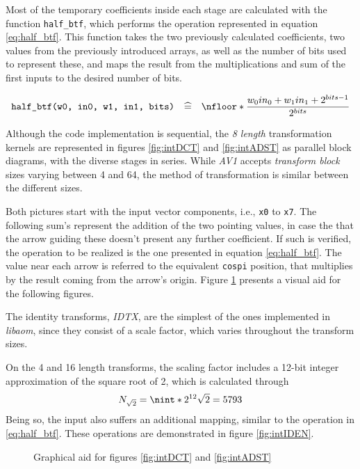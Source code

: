 Most of the temporary coefficients inside each stage are calculated with the function \verb|half_btf|, which performs the operation represented in equation \ref{eq:half_btf}. This function takes the two previously calculated coefficients, two values from the previously introduced arrays, as well as the number of bits used to represent these, and maps the result from the multiplications and sum of the first inputs to the desired number of bits.

\begin{equation} \label{eq:half_btf}
    \texttt{half\_btf(w0, in0, w1, in1, bits)} \quad \widehat{=} \quad \nfloor*{\frac{w_0in_0 + w_1in_1 + 2^{bits -1}}{2^{bits}}}
\end{equation}

Although the code implementation is sequential, the \emph{8 length} transformation kernels are represented in figures \ref{fig:intDCT} and \ref{fig:intADST} as parallel block diagrams, with the diverse stages in series. While \emph{AV1} accepts \emph{transform block} sizes varying between 4 and 64, the method of transformation is similar between the different sizes.

Both pictures start with the input vector components, i.e., \texttt{x0} to \texttt{x7}. The following sum's represent the addition of the two pointing values, in case the that the arrow guiding these doesn't present any further coefficient. If such is verified, the operation to be realized is the one presented in equation \ref{eq:half_btf}. The value near each arrow is referred to the equivalent \texttt{cospi} position, that multiplies by the result coming from the arrow's origin. Figure \ref{fig:aid} presents a visual aid for the following figures.

The identity transforms, \emph{IDTX}, are the simplest of the ones implemented in \emph{libaom}, since they consist of a scale factor, which varies throughout the transform sizes.

On the 4 and 16 length transforms, the scaling factor includes a 12-bit integer approximation of the square root of 2, which is calculated through
\begin{equation}
    N_{\sqrt{2}}=\nint*{2^{12}\sqrt{2}}=5793
\end{equation}
Being so, the input also suffers an additional mapping, similar to the operation in \ref{eq:half_btf}. These operations are demonstrated in figure \ref{fig:intIDEN}.

\begin{figure}[!htbp]
    \centering
    
    \caption{Graphical aid for figures \ref{fig:intDCT} and \ref{fig:intADST}}
    \label{fig:aid}
\end{figure}

